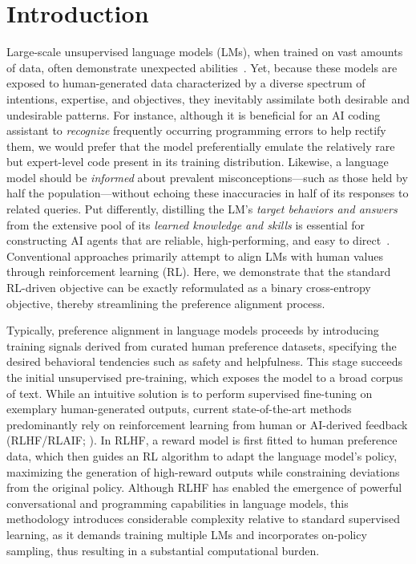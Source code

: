 \section{Introduction}
Large-scale unsupervised language models (LMs), when trained on vast amounts of data, often demonstrate unexpected abilities~\citep{chowdhery2022palm, brown2020language, touvron2023llama,bubeck2023sparks}. Yet, because these models are exposed to human-generated data characterized by a diverse spectrum of intentions, expertise, and objectives, they inevitably assimilate both desirable and undesirable patterns. For instance, although it is beneficial for an AI coding assistant to \textit{recognize} frequently occurring programming errors to help rectify them, we would prefer that the model preferentially emulate the relatively rare but expert-level code present in its training distribution. Likewise, a language model should be \textit{informed} about prevalent misconceptions—such as those held by half the population—without echoing these inaccuracies in half of its responses to related queries. Put differently, distilling the LM’s \emph{target behaviors and answers} from the extensive pool of its \textit{learned knowledge and skills} is essential for constructing AI agents that are reliable, high-performing, and easy to direct~\citep{ouyang2022training}. Conventional approaches primarily attempt to align LMs with human values through reinforcement learning (RL). Here, we demonstrate that the standard RL-driven objective can be exactly reformulated as a binary cross-entropy objective, thereby streamlining the preference alignment process.

Typically, preference alignment in language models proceeds by introducing training signals derived from curated human preference datasets, specifying the desired behavioral tendencies such as safety and helpfulness. This stage succeeds the initial unsupervised pre-training, which exposes the model to a broad corpus of text. While an intuitive solution is to perform supervised fine-tuning on exemplary human-generated outputs, current state-of-the-art methods predominantly rely on reinforcement learning from human or AI-derived feedback (RLHF/RLAIF; \citep{christiano2017deep,bai2022constitutional}). In RLHF, a reward model is first fitted to human preference data, which then guides an RL algorithm to adapt the language model’s policy, maximizing the generation of high-reward outputs while constraining deviations from the original policy. Although RLHF has enabled the emergence of powerful conversational and programming capabilities in language models, this methodology introduces considerable complexity relative to standard supervised learning, as it demands training multiple LMs and incorporates on-policy sampling, thus resulting in a substantial computational burden.

